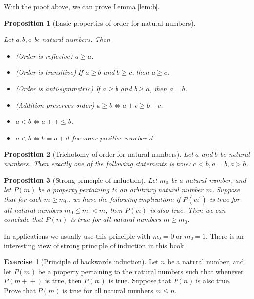 \documentclass[
]{book}
\providecommand{\tightlist}{%
  \setlength{\itemsep}{0pt}\setlength{\parskip}{0pt}}
\newtheorem{proposition}{Proposition}[chapter]
\theoremstyle{definition}
\theoremstyle{definition}
\theoremstyle{definition}
\newtheorem{exercise}{Exercise}[chapter]
\theoremstyle{definition}
\theoremstyle{remark}
\begin{document}
With the proof above, we can prove Lemma \ref{lem:b}.

\begin{proposition}[Basic properties of order for natural numbers]
\protect\hypertarget{prp:basicorder}{}\label{prp:basicorder}

Let \(a,b,c\) be natural numbers. Then

\begin{itemize}
\tightlist
\item
  (Order is reflexive) \(a\geq a\).
\item
  (Order is transitive) If \(a\geq b\) and \(b\geq c\), then \(a\geq c\).
\item
  (Order is anti-symmetric) If \(a\geq b\) and \(b \geq a\), then \(a=b\).
\item
  (Addition preserves order) \(a\geq b\iff a+c\geq b+c\).
\item
  \(a<b \iff a+\!\!+ \leq b\).\\
\item
  \(a<b \iff b = a+d\) for some positive number \(d\).
\end{itemize}

\end{proposition}

\begin{proposition}[Trichotomy of order for natural numbers]
\protect\hypertarget{prp:trichotomyorder}{}\label{prp:trichotomyorder}Let \(a\) and \(b\) be natural numbers. Then exactly one of the following statements is true: \(a<b,a=b,a>b\).
\end{proposition}

\begin{proposition}[Strong principle of induction]
\protect\hypertarget{prp:stronginduction}{}\label{prp:stronginduction}Let \(m_0\) be a natural number, and let \(P(m)\) be a property pertaining to an arbitrary natural number \(m\). Suppose that for each \(m\geq m_0\), we have the following implication: if \(P(m^{\prime})\) is true for all natural numbers \(m_0\leq m^{\prime} < m\), then \(P(m)\) is also true. Then we can conclude that \(P(m)\) is true for all natural numbers \(m \geq m_0\).
\end{proposition}

In applications we usually use this principle with \(m_0 =0\) or \(m_0 =1\). There is an interesting view of strong principle of induction in this \href{https://courses.csail.mit.edu/6.042/spring17/mcs.pdf}{book}.

\begin{exercise}[Principle of backwards induction]
\protect\hypertarget{exr:back}{}\label{exr:back}Let \(n\) be a natural number, and let \(P(m)\) be a property pertaining to the natural numbers such that whenever \(P(m+\!\!+)\) is true, then \(P(m)\) is true. Suppose that \(P(n)\) is also true. Prove that \(P(m)\) is true for all natural numbers \(m\leq n\).
\end{exercise}
\end{document}
